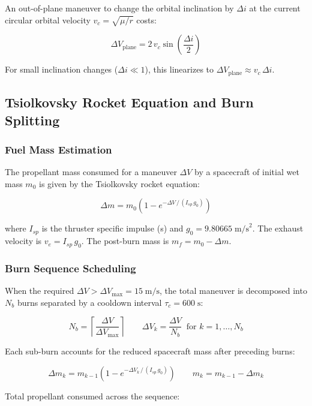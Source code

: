 \documentclass[11pt, a4paper]{article}
\begin{document}
An out-of-plane maneuver to change the orbital inclination by $\Delta i$ at the current
circular orbital velocity $v_c = \sqrt{\mu / r}$ costs:

\[
  \Delta V_{\text{plane}} = 2\,v_c \sin\!\left(\frac{\Delta i}{2}\right)
\]

For small inclination changes ($\Delta i \ll 1$), this linearizes to
$\Delta V_{\text{plane}} \approx v_c\,\Delta i$.

\subsection{Tsiolkovsky Rocket Equation and Burn Splitting}

\subsubsection{Fuel Mass Estimation}

The propellant mass consumed for a maneuver $\Delta V$ by a spacecraft of initial wet mass $m_0$
is given by the Tsiolkovsky rocket equation:

\[
  \Delta m = m_0 \left(1 - e^{-\Delta V \,/\, (I_{sp}\, g_0)}\right)
\]

where $I_{sp}$ is the thruster specific impulse (s) and $g_0 = 9.80665\;\text{m/s}^2$.
The exhaust velocity is $v_e = I_{sp}\,g_0$. The post-burn mass is $m_f = m_0 - \Delta m$.

\subsubsection{Burn Sequence Scheduling}

When the required $\Delta V > \Delta V_{\max} = 15\;\text{m/s}$, the total maneuver is
decomposed into $N_b$ burns separated by a cooldown interval $\tau_c = 600\;\text{s}$:

\[
  N_b = \left\lceil \frac{\Delta V}{\Delta V_{\max}} \right\rceil
  \qquad
  \Delta V_k = \frac{\Delta V}{N_b} \;\; \text{for } k = 1, \ldots, N_b
\]

Each sub-burn accounts for the reduced spacecraft mass after preceding burns:

\[
  \Delta m_k = m_{k-1} \left(1 - e^{-\Delta V_k \,/\, (I_{sp}\, g_0)}\right)
  \qquad m_k = m_{k-1} - \Delta m_k
\]

Total propellant consumed across the sequence:
\end{document}
